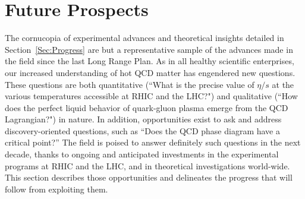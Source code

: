 \section{Future Prospects}
\label{Sec:Future}
The cornucopia of experimental advances and theoretical insights detailed in Section~\ref{Sec:Progress}
are but a representative sample of the advances made in the field since the last Long Range Plan.
As in all healthy scientific enterprises, our increased understanding of hot QCD matter
has engendered new questions. 
These questions are both quantitative
(``What is the precise value of $\eta/s$ at the various temperatures accessible at RHIC and the LHC?")
and qualitative
(``How does the perfect liquid behavior of quark-gluon plasma emerge from the QCD Lagrangian?")
in nature. 
In addition, opportunities exist to ask and address discovery-oriented
questions, such as ``Does the QCD phase diagram have a critical point?''
The field is poised to answer definitely such questions in the next decade,
thanks to ongoing and anticipated investments in the experimental programs 
at RHIC and the LHC, and in theoretical investigations world-wide. 
This section describes those opportunities and delineates the
progress that will follow from exploiting them.







